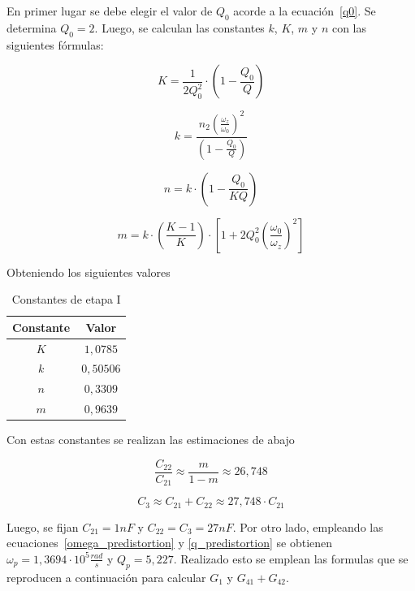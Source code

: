 En primer lugar se debe elegir el valor de $Q_0$ acorde a la ecuaci\'on~\ref{q0}. Se determina $Q_0 = 2$. Luego, se calculan las constantes $k$, $K$, $m$ y $n$ con las siguientes f\'ormulas:

\begin{equation}
\label{eq_ck}
K = \frac{1}{2Q_0^2} \cdot \left( 1- \frac{Q_0}{Q}\right)
\end{equation}

\begin{equation}
\label{eq_k}
k = \frac{n_2 \left( \frac{\omega_z}{\omega_0}\right)^2}{\left(1-\frac{Q_0}{Q}\right)}
\end{equation}

\begin{equation}
\label{eq_n}
n = k \cdot \left( 1-\frac{Q_0}{KQ}\right)
\end{equation}

\begin{equation}
\label{eq_m}
m = k\cdot \left( \frac{K-1}{K}\right) \cdot \left[ 1+2Q_0^2\left(\frac{\omega_0}{\omega_z}\right)^2\right]
\end{equation}

Obteniendo los siguientes valores

\begin{table}[H]
    \centering
    \begin{tabular}{c c}
        Constante & Valor\\
        \hline
         $K$ & $1,0785$ \\
	     $k$ & $0,50506$  \\
         $n$ & $0,3309$ \\
         $m$ & $0,9639$ \\
    \end{tabular}
    \caption{Constantes de etapa I}
    \label{tabla_stageI_ctes}
\end{table}

Con estas constantes se realizan las estimaciones de abajo

\begin{equation}
\frac{C_{22}}{C_{21}} \approx \frac{m}{1-m} \approx 26,748
\end{equation}

\begin{equation}
C_3 \approx C_{21}+C_{22}\approx 27,748 \cdot C_{21}
\end{equation}

Luego, se fijan $C_{21} = 1nF$ y $C_{22} = C_3 = 27nF$.
Por otro lado, empleando las ecuaciones~\ref{omega_predistortion} y \ref{q_predistortion} se obtienen $\omega_p = 1,3694 \cdot 10^5 \frac{rad}{s}$ y $Q_p = 5,227$. Realizado esto se emplean las formulas que se reproducen a continuaci\'on para calcular $G_1$ y $G_{41} + G_{42}$.

